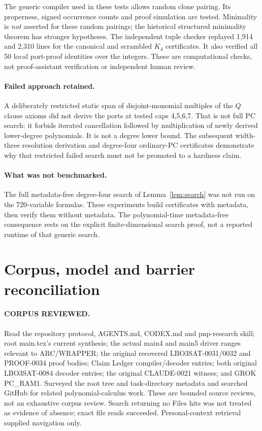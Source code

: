 \documentclass[11pt]{article}
\begin{document}
The generic compiler used in these tests allows random clone pairing. Its properness, signed occurrence counts and proof simulation are tested. Minimality is \emph{not} asserted for these random pairings; the historical structured minimality theorem has stronger hypotheses. The independent tuple checker replayed 1,914 and 2,310 lines for the canonical and scrambled $K_4$ certificates. It also verified all 50 local port-proof identities over the integers. These are computational checks, not proof-assistant verification or independent human review.

\paragraph{Failed approach retained.}
A deliberately restricted static span of disjoint-monomial multiples of the $Q$ clause axioms did not derive the ports at tested caps 4,5,6,7. That is not full PC search: it forbids iterated cancellation followed by multiplication of newly derived lower-degree polynomials. It is not a degree lower bound. The subsequent width-three resolution derivation and degree-four ordinary-PC certificates demonstrate why that restricted failed search must not be promoted to a hardness claim.

\paragraph{What was not benchmarked.}
The full metadata-free degree-four search of Lemma~\ref{lem:search} was not run on the 720-variable formulas. These experiments build certificates with metadata, then verify them without metadata. The polynomial-time metadata-free consequence rests on the explicit finite-dimensional search proof, not a reported runtime of that generic search.

\section{Corpus, model and barrier reconciliation}
\paragraph{CORPUS REVIEWED.}
Read the repository protocol, AGENTS.md, CODEX.md and pnp-research skill; root main.tex's current synthesis; the actual main4 and main5 driver ranges relevant to ARC/WRAPPER; the original recovered LBO3SAT-0031/0032 and PROOF-0034 proof bodies; Claim Ledger compiler/decoder entries; both original LBO3SAT-0084 decoder entries; the original CLAUDE-0021 witness; and GROK PC\_RAM1. Surveyed the root tree and task-directory metadata and searched GitHub for related polynomial-calculus work. These are bounded source reviews, not an exhaustive corpus review. Search returning no Files hits was not treated as evidence of absence; exact file reads succeeded. Personal-context retrieval supplied navigation only.
\end{document}
